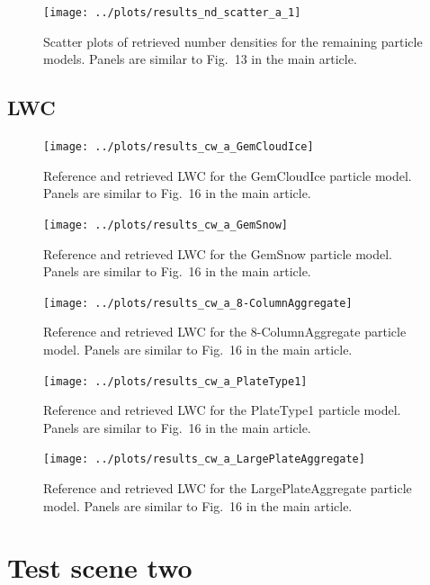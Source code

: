 \documentclass[journal abbreviation, manuscript]{copernicus}
\begin{document}
\begin{figure}[!hbpt]
\centering
\texttt{[image: ../plots/results\_nd\_scatter\_a\_1]}
\caption{Scatter plots of retrieved number densities for the remaining particle models. Panels
are similar to Fig.~13 in the main article.}
\end{figure}
\clearpage

\subsection{LWC}

\begin{figure}[!hbpt]
\centering
\texttt{[image: ../plots/results\_cw\_a\_GemCloudIce]}
\caption{Reference and retrieved LWC for the GemCloudIce particle model. Panels
are similar to Fig.~16 in the main article.}
\end{figure}
\clearpage

\begin{figure}[!hbpt]
\centering
\texttt{[image: ../plots/results\_cw\_a\_GemSnow]}
\caption{Reference and retrieved LWC for the GemSnow particle model. Panels
are similar to Fig.~16 in the main article.}
\end{figure}
\clearpage

\begin{figure}[!hbpt]
\centering
\texttt{[image: ../plots/results\_cw\_a\_8-ColumnAggregate]}
\caption{Reference and retrieved LWC for the 8-ColumnAggregate particle model. Panels
are similar to Fig.~16 in the main article.}
\end{figure}
\clearpage

\begin{figure}[!hbpt]
\centering
\texttt{[image: ../plots/results\_cw\_a\_PlateType1]}
\caption{Reference and retrieved LWC for the PlateType1 particle model. Panels
are similar to Fig.~16 in the main article.}
\end{figure}
\clearpage

\begin{figure}[!hbpt]
\centering
\texttt{[image: ../plots/results\_cw\_a\_LargePlateAggregate]}
\caption{Reference and retrieved LWC for the LargePlateAggregate particle model. Panels
are similar to Fig.~16 in the main article.}
\end{figure}
\clearpage

\section{Test scene two}
\end{document}
